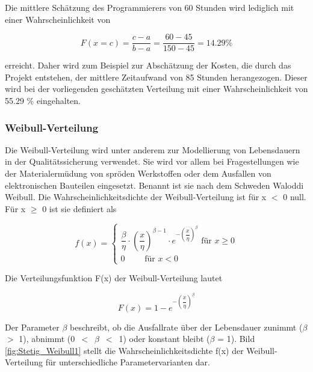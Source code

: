 \noindent Die mittlere Sch\"{a}tzung des Programmierers von 60 Stunden wird lediglich mit einer Wahrscheinlichkeit von 

\begin{equation}\label{eq:fourhundredseightyfive}
F(x=c)=\dfrac{c-a}{b-a} =\dfrac{60-45}{150-45} =14.29 \%
\end{equation}

\noindent erreicht. Daher wird zum Beispiel zur Absch\"{a}tzung der Kosten, die durch das Projekt entstehen, der mittlere Zeitaufwand von 85 Stunden herangezogen. Dieser wird bei der vorliegenden gesch\"{a}tzten Verteilung mit einer Wahrscheinlichkeit von 55.29 \% eingehalten.

\subsubsection{Weibull-Verteilung}

\noindent Die Weibull-Verteilung wird unter anderem zur Modellierung von Lebensdauern in der Qualit\"{a}tssicherung verwendet. Sie wird vor allem bei Fragestellungen wie der Materialerm\"{u}dung von spr\"{o}den Werkstoffen oder dem Ausfallen von elektronischen Bauteilen eingesetzt. Benannt ist sie nach dem Schweden Waloddi Weibull. Die Wahrscheinlichkeitsdichte der Weibull-Verteilung ist f\"{u}r x $\mathrm{<}$ 0 null. F\"{u}r x $\geq$ 0 ist sie definiert als

\begin{equation}\label{eq:fourhundredseightysix}
f(x)=\left\{\begin{array}{c} {\dfrac{\beta }{\eta } \cdot \left(\dfrac{x}{\eta } \right)^{\beta -1} \cdot e^{-\left(\dfrac{x}{\eta } \right)^{\beta } } \text{ für } x\ge 0} \\ 
{0 \qquad \text{ für } x<0} \end{array}\right.
\end{equation}

\noindent Die Verteilungsfunktion F(x) der Weibull-Verteilung lautet 

\begin{equation}\label{eq:fourhundredseightyseven}
F(x)=1-e^{-\left(\dfrac{x}{\eta } \right)^{\beta}}
\end{equation}

\noindent Der Parameter $\beta$ beschreibt, ob die Ausfallrate \"{u}ber der Lebensdauer zunimmt ($\beta$ $\mathrm{>}$ 1), abnimmt (0~$\mathrm{<}$~$\beta$~$\mathrm{<}$~1) oder konstant bleibt ($\beta$ = 1). Bild \ref{fig:Stetig_Weibull1} stellt die Wahrscheinlichkeitsdichte f(x) der Weibull-Verteilung f\"{u}r unterschiedliche Parametervarianten dar.

